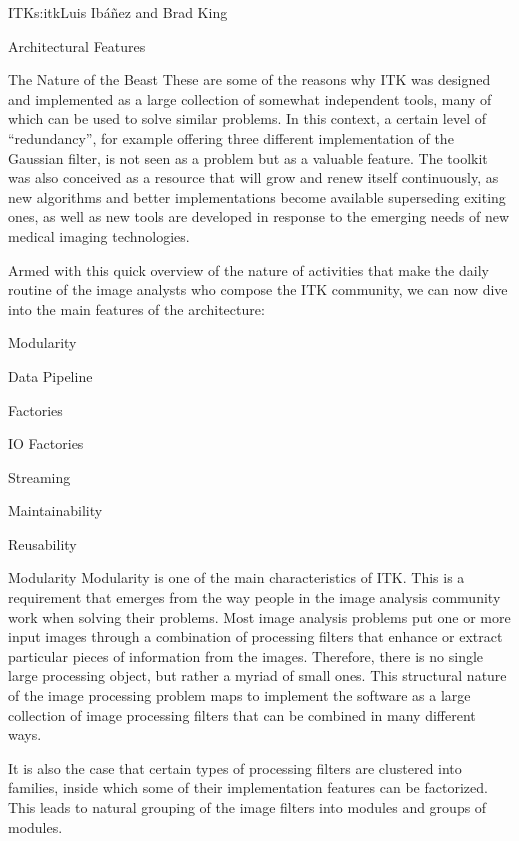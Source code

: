\begin{aosachapter}{ITK}{s:itk}{Luis Ib\'{a}\~{n}ez and Brad King}
\begin{aosasect1}{Architectural Features}
\begin{aosasect2}{The Nature of the Beast}
These are some of the reasons why ITK was designed and implemented as a large
collection of somewhat independent tools, many of which can be used to solve
similar problems. In this context, a certain level of ``redundancy'',
for example offering three different implementation of the Gaussian
filter, is not
seen as a problem but as a valuable feature. The toolkit was also conceived as
a resource that will grow and renew itself continuously, as new algorithms and
better implementations become available superseding exiting ones, as well as
new tools are developed in response to the emerging needs of new medical
imaging technologies.

Armed with this quick overview of the nature of activities that make the daily
routine of the image analysts who compose the ITK community, we can now dive
into the main features of the architecture:

\begin{aosaitemize}
\item Modularity
\item Data Pipeline
\item Factories
\item IO Factories
\item Streaming
\item Maintainability
\item Reusability
\end{aosaitemize}

\end{aosasect2}

\begin{aosasect2}{Modularity}
Modularity is one of the main characteristics of ITK. This is a requirement
that emerges from the way people in the image analysis community work when
solving their problems. Most image analysis problems put one or more
input images through a combination of processing filters that enhance or
extract particular pieces of information from the images. Therefore,
there is no single large processing object, but rather a myriad of small ones.
This structural nature of the image processing problem maps to implement the
software as a large collection of image processing filters that can be combined
in many different ways.

It is also the case that certain types of processing filters are clustered into
families, inside which some of their implementation features can be factorized.
This leads to natural grouping of the image filters into modules and groups of
modules.


\end{aosasect2}
\end{aosasect1}
\end{aosachapter}
